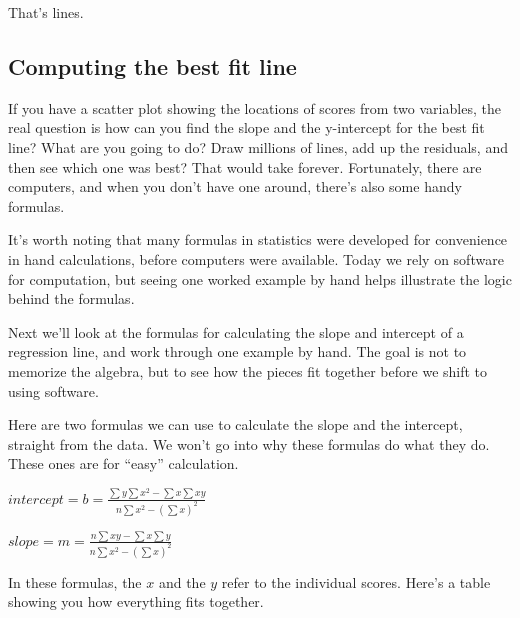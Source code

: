 \documentclass[
  letterpaper,
  DIV=11,
  numbers=noendperiod]{scrreprt}
\begin{document}
That's lines.

\subsection{Computing the best fit
line}\label{computing-the-best-fit-line}

If you have a scatter plot showing the locations of scores from two
variables, the real question is how can you find the slope and the
y-intercept for the best fit line? What are you going to do? Draw
millions of lines, add up the residuals, and then see which one was
best? That would take forever. Fortunately, there are computers, and
when you don't have one around, there's also some handy formulas.

\begin{tcolorbox}[enhanced jigsaw, title=\textcolor{quarto-callout-note-color}{\faInfo}\hspace{0.5em}{Note}, colframe=quarto-callout-note-color-frame, colbacktitle=quarto-callout-note-color!10!white, bottomtitle=1mm, leftrule=.75mm, rightrule=.15mm, titlerule=0mm, arc=.35mm, colback=white, opacitybacktitle=0.6, toprule=.15mm, toptitle=1mm, bottomrule=.15mm, coltitle=black, breakable, left=2mm, opacityback=0]

It's worth noting that many formulas in statistics were developed for
convenience in hand calculations, before computers were available. Today
we rely on software for computation, but seeing one worked example by
hand helps illustrate the logic behind the formulas.

\end{tcolorbox}

Next we'll look at the formulas for calculating the slope and intercept
of a regression line, and work through one example by hand. The goal is
not to memorize the algebra, but to see how the pieces fit together
before we shift to using software.

Here are two formulas we can use to calculate the slope and the
intercept, straight from the data. We won't go into why these formulas
do what they do. These ones are for ``easy'' calculation.

\(intercept = b = \frac{\sum{y}\sum{x^2}-\sum{x}\sum{xy}}{n\sum{x^2}-(\sum{x})^2}\)

\(slope = m = \frac{n\sum{xy}-\sum{x}\sum{y}}{n\sum{x^2}-(\sum{x})^2}\)

In these formulas, the \(x\) and the \(y\) refer to the individual
scores. Here's a table showing you how everything fits together.
\end{document}
